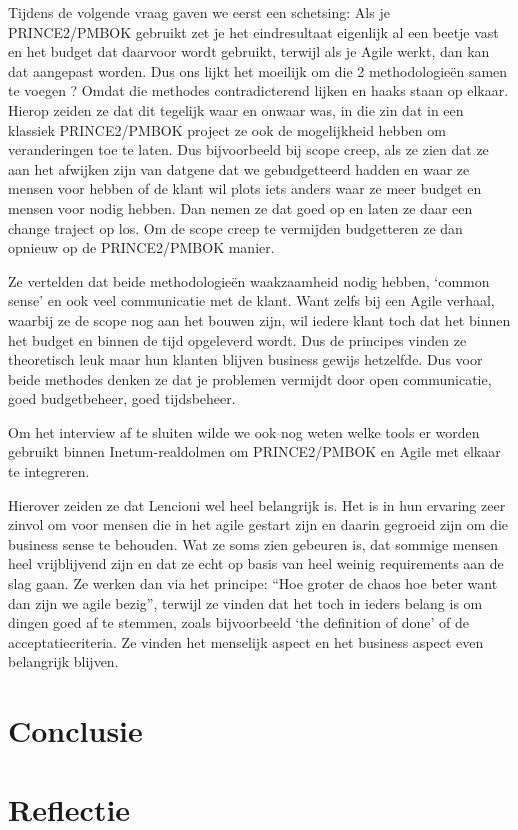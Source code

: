 \documentclass[dutch]{hogent-article}
\begin{document}
Tijdens de volgende vraag gaven we eerst een schetsing: Als je PRINCE2/PMBOK gebruikt zet je het eindresultaat eigenlijk al een beetje vast en het budget dat daarvoor wordt gebruikt, terwijl als je Agile werkt, dan kan dat aangepast worden. Dus ons lijkt het moeilijk om die 2 methodologieën samen te voegen ? Omdat die methodes contradicterend lijken en haaks staan op elkaar. Hierop zeiden ze dat dit tegelijk waar en onwaar was, in die zin dat in een klassiek PRINCE2/PMBOK project ze ook de mogelijkheid hebben om veranderingen toe te laten. Dus bijvoorbeeld bij scope creep, als ze zien dat ze aan het afwijken zijn van datgene dat we gebudgetteerd hadden en waar ze mensen voor hebben of de klant wil plots iets anders waar ze meer budget en mensen voor nodig hebben. Dan nemen ze dat goed op en  laten ze daar een change traject op los. Om de scope creep te vermijden budgetteren ze dan opnieuw op de PRINCE2/PMBOK manier. 
\newline

Ze vertelden dat beide methodologieën waakzaamheid nodig hebben, ‘common sense’ en ook veel communicatie met de klant. Want zelfs bij een Agile verhaal, waarbij ze de scope nog aan het bouwen zijn, wil iedere klant toch dat het binnen het budget en binnen de tijd opgeleverd wordt. Dus de principes vinden ze theoretisch leuk maar hun klanten blijven business gewijs hetzelfde. Dus voor beide methodes denken ze dat je problemen vermijdt door open communicatie, goed budgetbeheer, goed tijdsbeheer.
\newline

Om het interview af te sluiten wilde we ook nog weten welke tools er worden gebruikt binnen Inetum-realdolmen om PRINCE2/PMBOK en Agile met elkaar te integreren. 
\newline

Hierover zeiden ze dat Lencioni wel heel belangrijk is. Het is in hun ervaring zeer zinvol om voor mensen die in het agile gestart zijn en daarin gegroeid zijn om die business sense te behouden. Wat ze soms zien gebeuren is, dat sommige mensen heel vrijblijvend zijn en dat ze echt op basis van heel weinig requirements aan de slag gaan. Ze werken dan via het principe: “Hoe groter de chaos hoe beter want dan zijn we agile bezig”, terwijl ze vinden dat het toch in ieders belang is om dingen goed af te stemmen, zoals bijvoorbeeld ‘the definition of done’ of de acceptatiecriteria. Ze vinden het menselijk aspect en het business aspect even belangrijk blijven.
\autocite{Mousaei2018}

\section{Conclusie}%
\label{sec:conclusie}


\section{Reflectie}
\label{sec:reflectie}

\printbibliography[heading=bibintoc]
\end{document}
